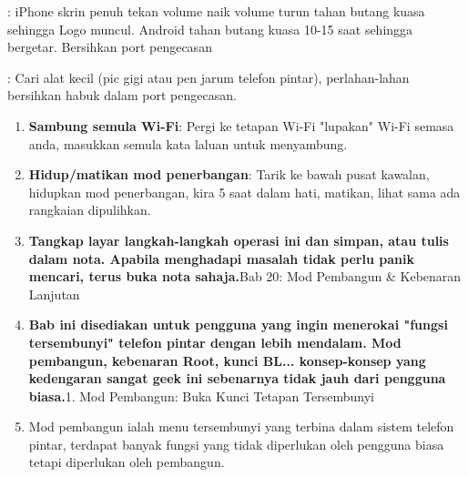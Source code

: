 \begin{tcbwarn}{: iPhone skrin penuh tekan volume naik volume turun tahan butang kuasa sehingga Logo muncul. Android tahan butang kuasa 10-15 saat sehingga bergetar.}
Bersihkan port pengecasan

\end{tcbwarn}

\begin{tcbpractice}{: Cari alat kecil (pic gigi atau pen jarum telefon pintar), perlahan-lahan bersihkan habuk dalam port pengecasan.}
\begin{enumerate}
  \item \textbf{Sambung semula Wi-Fi}: Pergi ke tetapan Wi-Fi "lupakan" Wi-Fi semasa anda, masukkan semula kata laluan untuk menyambung.
  \item \textbf{Hidup/matikan mod penerbangan}: Tarik ke bawah pusat kawalan, hidupkan mod penerbangan, kira 5 saat dalam hati, matikan, lihat sama ada rangkaian dipulihkan.
  \item \textbf{Tangkap layar langkah-langkah operasi ini dan simpan, atau tulis dalam nota. Apabila menghadapi masalah tidak perlu panik mencari, terus buka nota sahaja.}Bab 20: Mod Pembangun \& Kebenaran Lanjutan
  \item \textbf{Bab ini disediakan untuk pengguna yang ingin menerokai "fungsi tersembunyi" telefon pintar dengan lebih mendalam. Mod pembangun, kebenaran Root, kunci BL... konsep-konsep yang kedengaran sangat geek ini sebenarnya tidak jauh dari pengguna biasa.}1. Mod Pembangun: Buka Kunci Tetapan Tersembunyi
  \item Mod pembangun ialah menu tersembunyi yang terbina dalam sistem telefon pintar, terdapat banyak fungsi yang tidak diperlukan oleh pengguna biasa tetapi diperlukan oleh pembangun.
\end{enumerate}

\end{tcbpractice}
